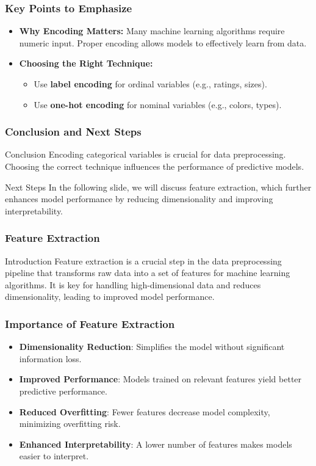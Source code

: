 \documentclass[aspectratio=169]{beamer}
\begin{document}
\begin{frame}
    \frametitle{Key Points to Emphasize}
    \begin{itemize}
        \item \textbf{Why Encoding Matters:} 
        Many machine learning algorithms require numeric input.
        Proper encoding allows models to effectively learn from data.
        
        \item \textbf{Choosing the Right Technique:} 
        \begin{itemize}
            \item Use \textbf{label encoding} for ordinal variables (e.g., ratings, sizes).
            \item Use \textbf{one-hot encoding} for nominal variables (e.g., colors, types).
        \end{itemize}
    \end{itemize}
\end{frame}

\begin{frame}
    \frametitle{Conclusion and Next Steps}
    \begin{block}{Conclusion}
        Encoding categorical variables is crucial for data preprocessing. 
        Choosing the correct technique influences the performance of predictive models.
    \end{block}
    \begin{block}{Next Steps}
        In the following slide, we will discuss feature extraction, 
        which further enhances model performance by reducing dimensionality and improving interpretability.
    \end{block}
\end{frame}

\begin{frame}
    \frametitle{Feature Extraction}
    \begin{block}{Introduction}
        Feature extraction is a crucial step in the data preprocessing pipeline that transforms raw data into a set of features for machine learning algorithms. It is key for handling high-dimensional data and reduces dimensionality, leading to improved model performance.
    \end{block}
\end{frame}

\begin{frame}
    \frametitle{Importance of Feature Extraction}
    \begin{itemize}
        \item \textbf{Dimensionality Reduction}: Simplifies the model without significant information loss.
        \item \textbf{Improved Performance}: Models trained on relevant features yield better predictive performance.
        \item \textbf{Reduced Overfitting}: Fewer features decrease model complexity, minimizing overfitting risk.
        \item \textbf{Enhanced Interpretability}: A lower number of features makes models easier to interpret.
    \end{itemize}
\end{frame}
\end{document}
